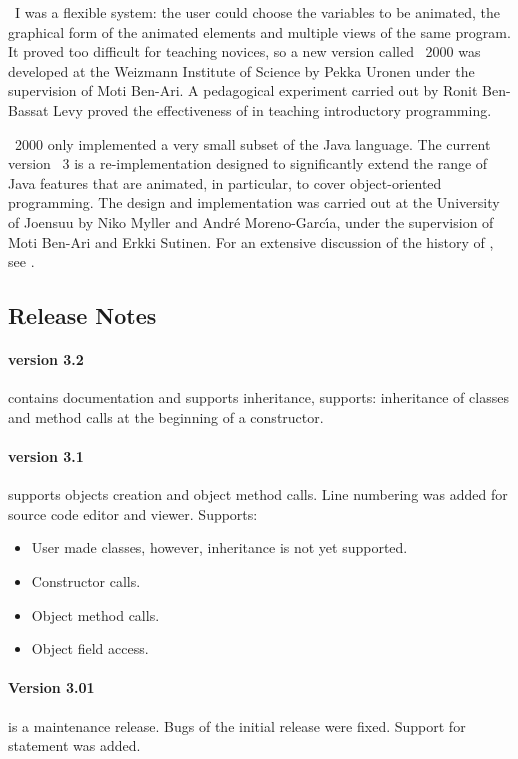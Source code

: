 \jel{}~I was a flexible system: the user could choose the variables to
be animated, the graphical form of the animated elements and multiple
views of the same program. It proved too difficult for teaching novices,
so a new version called \jel{}~2000 was developed at the Weizmann Institute
of Science by Pekka Uronen under the supervision of Moti Ben-Ari.
A pedagogical experiment carried out by Ronit Ben-Bassat Levy proved
the effectiveness of \jel{} in teaching introductory programming.

\jel{}~2000 only implemented a very small subset of the Java language.
The current version \jel{}~3 is a re-implementation designed to
significantly extend the range of Java features that are animated,
in particular, to cover object-oriented programming. The design and
implementation was carried out at the University of Joensuu by
Niko Myller and Andr{\'{e}} Moreno-Garc{\'{\i}}a, under the supervision
of Moti Ben-Ari and Erkki Sutinen. For an extensive discussion of the
history of \jel{}, see \citep{Benari2002a}.

\subsection{Release Notes}
\label{sec:Release_Notes}

\paragraph{version 3.2} contains documentation and supports
inheritance, supports: inheritance of classes and 
method calls at the beginning of a constructor.

\paragraph{version 3.1} supports objects creation and object method
calls. Line numbering was added for source code editor and viewer.
Supports:
\begin{itemize} \item User made classes, however,
inheritance is not yet supported. \item Constructor calls. \item
Object method calls. \item Object field access.
\end{itemize}


\paragraph{Version 3.01} is a maintenance release. Bugs of the initial
release were fixed. Support for  statement was added.

